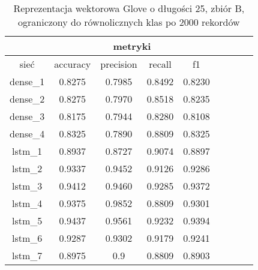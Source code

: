 \begin{table}[h] \label{tab:wyniki_glove_B_lim} \centering
    \caption{Reprezentacja wektorowa Glove o długości 25, zbiór B, ograniczony do równolicznych klas po 2000 rekordów}
    \label{tab:wyniki_25_eks3}
    \begin{tabular} {|c|c|c|c|c|c|c|c|c| }    \hline
                 & \multicolumn{4}{c|}{metryki}                                                                                        \\ \hline
        sieć     & accuracy                     & precision                  & recall                     & f1                         \\ \hline
        dense\_1 & 0.8275                       & 0.7985                     & 0.8492                     & 0.8230                     \\ \hline
        dense\_2 & 0.8275                       & 0.7970                     & 0.8518                     & 0.8235                     \\ \hline
        dense\_3 & 0.8175                       & 0.7944                     & 0.8280                     & 0.8108                     \\ \hline
        dense\_4 & 0.8325                       & 0.7890                     & 0.8809                     & 0.8325                     \\ \hline
        lstm\_1  & 0.8937                       & 0.8727                     & 0.9074                     & 0.8897                     \\ \hline
        lstm\_2  & 0.9337                       & 0.9452                     & 0.9126                     & 0.9286                     \\ \hline
        lstm\_3  & 0.9412                       & 0.9460                     & 0.9285                     & 0.9372                     \\ \hline
        lstm\_4  & 0.9375                       & 0.9852                     & 0.8809                     & 0.9301                     \\ \hline
        lstm\_5  & 0.9437                       & 0.9561                     & 0.9232                     & 0.9394                     \\ \hline
        lstm\_6  & 0.9287                       & 0.9302                     & 0.9179                     & 0.9241                     \\ \hline
        lstm\_7  & 0.8975                       & 0.9                        & 0.8809                     & 0.8903                     \\ \hline

\end{tabular}
\end{table}
